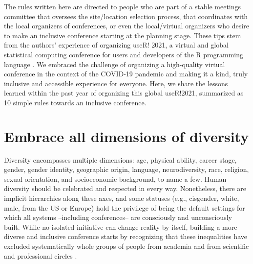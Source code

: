 \documentclass[10pt,letterpaper]{article}
\begin{document}
The rules written here are directed to people who are part of a stable meetings committee that oversees the site/location selection process, that coordinates with the local organizers of conferences, or even the local/virtual organizers who desire to make an inclusive conference starting at the planning stage.
These tips stem from the authors' experience of organizing useR! 2021, a virtual and global statistical computing conference for users and developers of the R programming language \cite{r_core_team_2021}. 
We embraced the challenge of organizing a high-quality virtual conference in the context of the COVID-19 pandemic and making it a kind, truly inclusive and accessible experience for everyone. 
Here, we share the lessons learned within the past year of organizing this global useR!2021, summarized as 10 simple rules towards an inclusive conference.




\section{Embrace all dimensions of diversity}
\label{rule_diversity}
Diversity encompasses multiple dimensions: age, physical ability, career stage, gender, gender identity, geographic origin, language, neurodiversity, race, religion, sexual orientation, and socioeconomic background, to name a few. Human diversity should be celebrated and respected in every way. Nonetheless, there are implicit hierarchies along these axes, and some statuses (e.g., cisgender, white, male, from the US or Europe) hold the privilege of being the default settings for which all systems --including conferences-- are consciously and unconsciously built. While no isolated initiative can change reality by itself, building a more diverse and inclusive conference starts by recognizing that these inequalities have excluded systematically whole groups of people from academia and from scientific and professional circles \cite{timperleyHeMoanaPukepuke2020}. 
\end{document}
